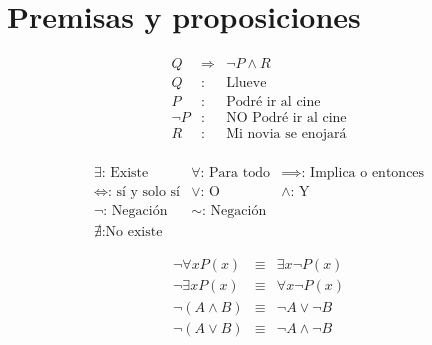 \documentclass{beamer}
\begin{document}
\section{Premisas y proposiciones}
\begin{frame}
\begin{equation}
\begin{array}{rcl}
Q & \Rightarrow & \neg P \land R\\
Q & : & \text{Llueve}\\
P & : & \text{Podré ir al cine}\\
\neg P & : & \text{NO Podré ir al cine}\\
R & : & \text{Mi novia se enojará}\\

\end{array}
\end{equation}
\end{frame}

\begin{frame}
\begin{equation}
\begin{array}{c|c|c}
\exists \text{: Existe} & \forall \text{: Para todo} & \implies\text{: Implica o entonces}\\
\iff \text{: sí y solo sí} & \lor \text{: O} & \land\text{: Y}\\
\neg\text{: Negación} & \sim\text{: Negación} & \\
\nexists\text{:No existe}
\end{array}
\end{equation}

\begin{equation}
\begin{array}{ccc}
\neg\forall x P(x) & \equiv & \exists x \neg P(x)\\
\neg\exists x P(x) & \equiv & \forall x \neg P(x)\\
\neg(A \land B) & \equiv & \neg A \lor \neg B\\
\neg(A \lor B) & \equiv & \neg A \land \neg B
\end{array}
\end{equation}
\end{frame}
\end{document}
